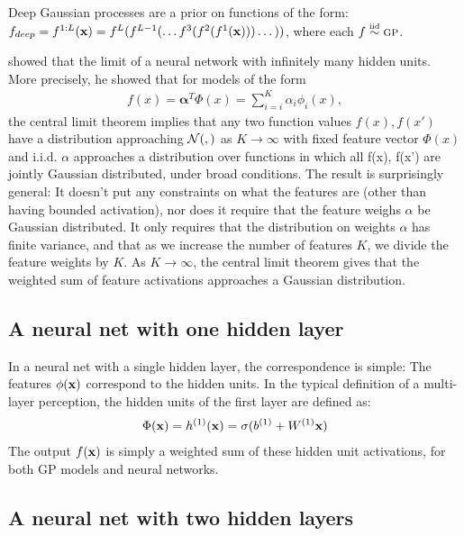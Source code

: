 \documentclass{article}
\begin{document}
Deep Gaussian processes \cite{damianou2012deep} are a prior on functions of the form: $f_{deep} = f^{1:L}({\bf{x}}) = f^L(f^{L-1}(\dots f^3(f^2(f^1({\bf{x}})))\dots))$, where each $f \simiid \gp{}$.




\cite{neal1995bayesian} showed that the limit of a neural network with infinitely many hidden units. More precisely, he showed that for models of the form
%
\begin{align}
f(x) = {\mathbf \alpha}^T \Phi(x) = \sum_{i=i}^K \alpha_i \phi_i(x),
\end{align}
%
the central limit theorem implies that any two function values $f(x), f(x')$ have a distribution approaching $\mathcal{N}\!\left(,\right)$ as $K \rightarrow \infty$ with fixed feature vector $\Phi(x)$ and i.i.d. $\alpha$ approaches a distribution over functions in which all f(x), f(x') are jointly Gaussian distributed, under broad conditions. The result is surprisingly general:  It doesn't put any constraints on what the features are (other than having bounded activation), nor does it require that the feature weighs $\alpha$ be Gaussian distributed.  It only requires that the distribution on weights $\alpha$ has finite variance, and that as we increase the number of features $K$, we divide the feature weights by $K$.  As $K \rightarrow \infty$, the central limit theorem gives that the weighted sum of feature activations approaches a Gaussian distribution.

\subsection{A neural net with one hidden layer}

In a neural net with a single hidden layer, the correspondence is simple:  The features $\phi({\bf{x}})$ correspond to the hidden units.  In the typical definition of a multi-layer perception, the hidden units of the first layer are defined as:
%
\begin{align}
\Phi({\bf{x}}) = h^{(1)}({\bf{x}}) = \sigma( b^{(1)} + W^{(1)}{\bf{x}} )
\end{align}
%
The output $f({\bf{x}})$ is simply a weighted sum of these hidden unit activations, for both GP models and neural networks.

\subsection{A neural net with two hidden layers}
\end{document}
